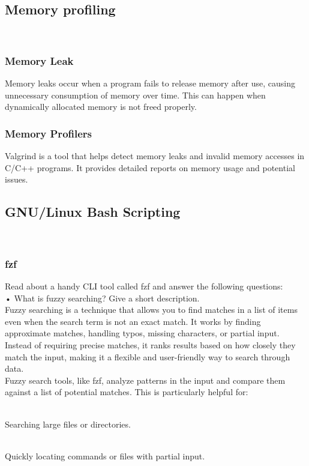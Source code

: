 \documentclass[a4paper,12pt]{article}
\begin{document}
\\
\\
\subsection{Memory profiling}
\\
\subsubsection{Memory Leak}
Memory leaks occur when a program fails to release memory after use, causing unnecessary consumption of memory over time. This can happen when dynamically allocated memory is not freed properly.

\subsubsection{Memory Profilers}
Valgrind is a tool that helps detect memory leaks and invalid memory accesses in C/C++ programs. It provides detailed reports on memory usage and potential issues.

\subsection{GNU/Linux Bash Scripting}
\\
\subsubsection{fzf}
Read about a handy CLI tool called fzf and answer the following questions:
\\• What is fuzzy searching? Give a short description.
\\Fuzzy searching is a technique that allows you to find matches in a list of items even when the search term is not an exact match. It works by finding approximate matches, handling typos, missing characters, or partial input. Instead of requiring precise matches, it ranks results based on how closely they match the input, making it a flexible and user-friendly way to search through data.
\\Fuzzy search tools, like fzf, analyze patterns in the input and compare them against a list of potential matches. This is particularly helpful for:

\\Searching large files or directories.

\\Quickly locating commands or files with partial input.
\end{document}
